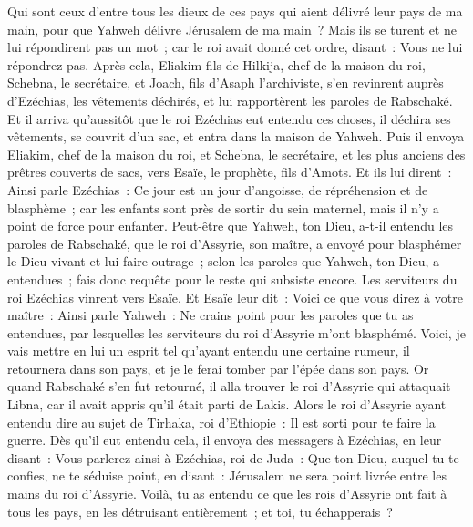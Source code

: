 \begin{multicols}{2}
Qui sont ceux d'entre tous les dieux de ces pays qui aient délivré leur pays de ma main, pour que Yahweh délivre Jérusalem de ma main~?
Mais ils se turent et ne lui répondirent pas un mot~; car le roi avait donné cet ordre, disant~: Vous ne lui répondrez pas.
Après cela, Eliakim fils de Hilkija, chef de la maison du roi, Schebna, le secrétaire, et Joach, fils d'Asaph l'archiviste, s'en revinrent auprès d'Ezéchias, les vêtements déchirés, et lui rapportèrent les paroles de Rabschaké.
\VerseOne{}Et il arriva qu'aussitôt que le roi Ezéchias eut entendu ces choses, il déchira ses vêtements, se couvrit d'un sac, et entra dans la maison de Yahweh.
Puis il envoya Eliakim, chef de la maison du roi, et Schebna, le secrétaire, et les plus anciens des prêtres couverts de sacs, vers Esaïe, le prophète, fils d'Amots.
Et ils lui dirent~: Ainsi parle Ezéchias~: Ce jour est un jour d'angoisse, de répréhension et de blasphème~; car les enfants sont près de sortir du sein maternel, mais il n'y a point de force pour enfanter.
Peut-être que Yahweh, ton Dieu, a-t-il entendu les paroles de Rabschaké, que le roi d'Assyrie, son maître, a envoyé pour blasphémer le Dieu vivant et lui faire outrage~; selon les paroles que Yahweh, ton Dieu, a entendues~; fais donc requête pour le reste qui subsiste encore.
Les serviteurs du roi Ezéchias vinrent vers Esaïe.
Et Esaïe leur dit~: Voici ce que vous direz à votre maître~: Ainsi parle Yahweh~: Ne crains point pour les paroles que tu as entendues, par lesquelles les serviteurs du roi d'Assyrie m'ont blasphémé.
Voici, je vais mettre en lui un esprit tel qu'ayant entendu une certaine rumeur, il retournera dans son pays, et je le ferai tomber par l'épée dans son pays.
Or quand Rabschaké s'en fut retourné, il alla trouver le roi d'Assyrie qui attaquait Libna, car il avait appris qu'il était parti de Lakis.
Alors le roi d'Assyrie ayant entendu dire au sujet de Tirhaka, roi d'Ethiopie~: Il est sorti pour te faire la guerre. Dès qu'il eut entendu cela, il envoya des messagers à Ezéchias, en leur disant~:
Vous parlerez ainsi à Ezéchias, roi de Juda~: Que ton Dieu, auquel tu te confies, ne te séduise point, en disant~: Jérusalem ne sera point livrée entre les mains du roi d'Assyrie.
Voilà, tu as entendu ce que les rois d'Assyrie ont fait à tous les pays, en les détruisant entièrement~; et toi, tu échapperais~?

\end{multicols}
